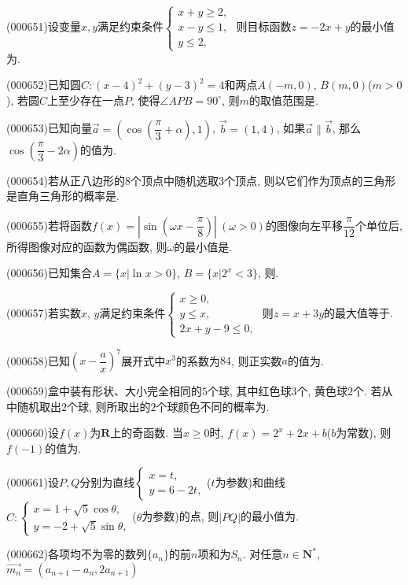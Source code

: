 \item (000651)设变量$x,y$满足约束条件$\begin{cases} x+y\ge 2, \\ x-y\le 1, \\ y\le 2,\end{cases}$ 则目标函数$z=-2x+y$的最小值为.
\item (000652)已知圆$C:(x-4)^2+(y-3)^2=4$和两点$A(-m,0)$, $B(m,0)$($m>0$), 若圆$C$上至少存在一点$P$, 使得$\angle APB=90^\circ $, 则$m$的取值范围是.
\item (000653)已知向量$\overrightarrow a=(\cos(\dfrac{\pi}3+\alpha),1)$, $\overrightarrow b=(1,4)$, 如果$\overrightarrow a \parallel \overrightarrow b$, 那么$\cos(\dfrac{\pi}3-2\alpha)$的值为.
\item (000654)若从正八边形的$8$个顶点中随机选取$3$个顶点, 则以它们作为顶点的三角形是直角三角形的概率是.
\item (000655)若将函数$f(x)=|\sin(\omega x-\dfrac{\pi}8)| \ (\omega >0)$的图像向左平移$\dfrac{\pi}{12}$个单位后, 所得图像对应的函数为偶函数, 则$\omega$的最小值是.
\item (000656)已知集合$A=\{x|\ln x>0 \}$, $B=\{x|2^x<3\}$, 则.
\item (000657)若实数$x$, $y$满足约束条件$\begin{cases} x\ge 0, \\  y\le x, \\  2x+y-9 \le 0, \end{cases}$ 则$z=x+3y$的最大值等于.
\item (000658)已知$(x-\dfrac ax)^7$展开式中$x^3$的系数为$84$, 则正实数$a$的值为.
\item (000659)盒中装有形状、大小完全相同的$5$个球, 其中红色球$3$个, 黄色球$2$个. 若从中随机取出$2$个球, 则所取出的$2$个球颜色不同的概率为.
\item (000660)设$f(x)$为$\mathbf{R}$上的奇函数. 当$x\ge 0$时, $f(x)=2^x+2x+b$($b$为常数), 则$f(-1)$的值为.
\item (000661)设$P,Q$分别为直线$\begin{cases}  x=t, \\  y=6-2t, \end{cases}$($t$为参数)和曲线$C:\begin{cases} x=1+\sqrt5\cos\theta, \\ y=-2+\sqrt5\sin\theta,\end{cases}$($\theta$为参数)的点, 则$|PQ|$的最小值为.
\item (000662)各项均不为零的数列$\{a_n\}$的前$n$项和为$S_n$.  对任意$n\in \mathbf{N}^*$, $\overrightarrow{m_n}=(a_{n+1}-a_n,2a_{n+1})$
